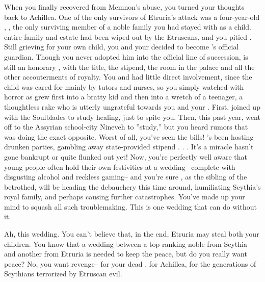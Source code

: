 \documentclass[char]{Kos}
\begin{document}
When you finally recovered from Memnon's abuse, you turned your thoughts back to Achillea. One of the only survivors of Etruria's attack was a four-year-old \cWard{\kid}, \cWard{}, the only surviving member of a noble family you had stayed with as a child. \cWard{\Their} entire family and estate had been wiped out by the Etruscans, and you pitied \cWard{\them}. Still grieving for your own child, you and your \cScythiaKing{\spouse} decided to become \cWard{}'s official guardian. Though you never adopted him into the official line of succession, \cWard{\they} is still an honorary \cWard{\prince}, with the title, the stipend, the room in the palace and all the other accouterments of royalty. You and \cScythiaKing{} had little direct involvement, since the child was cared for mainly by tutors and nurses, so you simply watched with horror as \cWard{} grew first into a bratty kid and then into a wretch of a teenager, a thoughtless rake who is utterly ungrateful towards you and your \cScythiaKing{\spouse}. First, \cWard{\they} joined up with the Soulblades to study healing, just to spite you. Then, this past year, \cWard{\they} went off to the Assyrian school-city Nineveh to ''study,'' but you heard rumors that \cWard{\they} was doing the exact opposite. Worst of all, you've seen the bills! \cWard{\They}'s been hosting drunken parties, gambling away \cWard{\their} state-provided stipend . . . It's a miracle \cWard{\they} hasn't gone bankrupt or quite flunked out yet! Now, you're perfectly well aware that young people often hold their own festivities at a wedding-- complete with disgusting alcohol and reckless gaming-- and you're sure \cWard{}, as the sibling of the betrothed, will be heading the debauchery this time around, humiliating Scythia's royal family, and perhaps causing further catastrophes. You've made up your mind to squash all such troublemaking. This is one wedding that can do without it.

Ah, this wedding. You can't believe that, in the end, Etruria may steal both your children. You know that a wedding between a top-ranking noble from Scythia and another from Etruria is needed to keep the peace, but do you really want peace? No, you want revenge-- for your dead \cFugitive{\offspring}, for Achillea, for the generations of Scythians terrorized by Etruscan evil. 
\end{document}

